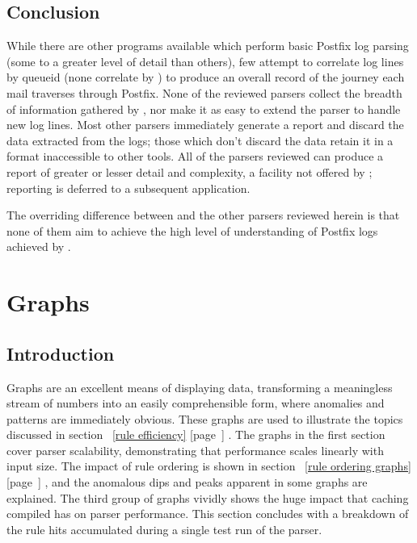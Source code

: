 \documentclass[a4paper,12pt,draft]{article}
\newcommand{\parsername}{\PLP{}}
\newcommand{\refwithpage}[1]{%
    \empty{}\ref{#1} [page~\pageref{#1}]%
}
\begin{document}
\subsection{Conclusion}

While there are other programs available which perform basic Postfix log
parsing (some to a greater level of detail than others), few attempt to
correlate log lines by queueid (none correlate by \pid{}) to produce an
overall record of the journey each mail traverses through Postfix.  None of
the reviewed parsers collect the breadth of information gathered by
\parsername{}, nor make it as easy to extend the parser to handle new log
lines.  Most other parsers immediately generate a report and discard the
data extracted from the logs; those which don't discard the data retain it
in a format inaccessible to other tools.  All of the parsers reviewed can
produce a report of greater or lesser detail and complexity, a facility not
offered by \parsername{}; reporting is deferred to a subsequent
application.

The overriding difference between \parsername{} and the other parsers
reviewed herein is that none of them aim to achieve the high level of
understanding of Postfix logs achieved by \parsername{}.




\label{bibliography}

\section{Graphs}

\label{graphs}

\renewcommand{\figurename}{Graph}

\subsection{Introduction}

Graphs are an excellent means of displaying data, transforming a
meaningless stream of numbers into an easily comprehensible form, where
anomalies and patterns are immediately obvious.  These graphs are used to
illustrate the topics discussed in section~\refwithpage{rule efficiency}.
The graphs in the first section cover parser scalability, demonstrating
that performance scales linearly with input size.  The impact of rule
ordering is shown in section~\refwithpage{rule ordering graphs}, and the
anomalous dips and peaks apparent in some graphs are explained.  The third
group of graphs vividly shows the huge impact that caching compiled
\regexes{} has on parser performance.  This section concludes with a
breakdown of the rule hits accumulated during a single test run of the
parser.
\end{document}
